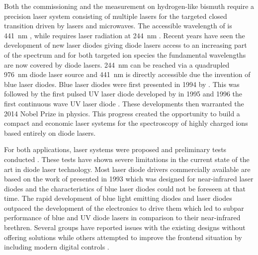 Both the commissioning and the measurement on hydrogen-like bismuth require a precision laser system consisting of multiple lasers for the targeted closed transition driven by lasers and microwaves. The accessible wavelength of  is \qty{441}{\nm} \cite{ar13+_wavelength}, while  requires laser radiation at \qty{244}{\nm} \cite{bi82+_wavelength}. Recent years have seen the development of new laser diodes giving diode lasers access to an increasing part of the spectrum and for both targeted ion species the fundamental wavelengths are now covered by diode lasers. \qty{244}{\nm} can be reached via a quadrupled \qty{976}{\nm} diode laser source and \qty{441}{\nm} is directly accessible due the invention of blue laser diodes. Blue laser diodes were first presented in 1994 by \citeauthor{Nakamura_1996} \cite{Nakamura_1996}. This was followed by the first pulsed UV laser diode developed by \citeauthor{uv_pulsed_laser_diode_first} \cite{uv_pulsed_laser_diode_first} in 1995 and 1996 the first continuous wave UV laser diode \cite{uv_cw_laser_diode_first}. These developments then warranted the 2014 Nobel Prize in physics. This progress created the opportunity to build a compact and economic laser systems for the spectroscopy of highly charged ions based entirely on diode lasers.

For both applications, laser systems were proposed and preliminary tests conducted \cite{thesis_baus,thesis_alex,thesis_tilman,thesis_seppo}. These tests have shown severe limitations in the current state of the art in diode laser technology. Most laser diode drivers commercially available are based on the work of \citeauthor{libbrecht_hall} presented in 1993 \cite{libbrecht_hall} which was designed for near-infrared laser diodes and the characteristics of blue laser diodes could not be foreseen at that time. The rapid development of blue light emitting diodes and laser diodes outpaced the development of the electronics to drive them which led to subpar performance of blue and UV diode lasers in comparison to their near-infrared brethren. Several groups have reported issues with the existing designs \cite{laser_driver_mosfet_noise} without offering solutions while others attempted to improve the frontend situation by including modern digital controls \cite{laser_driver_digital}.

